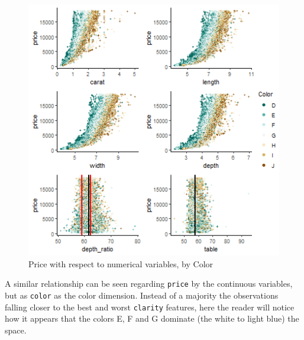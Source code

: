 \documentclass[
  paper=a4,
  ,captions=tableheading
]{scrartcl}
\begin{document}
\begin{figure}[H]

{\centering \includegraphics[width=\linewidth,]{Diamonds_PDF_files/figure-latex/Price by X and Color-1}

}

\caption{Price with respect to numerical variables, by Color}\label{fig:Price by X and Color}
\end{figure}

A similar relationship can be seen regarding \texttt{price} by the
continuous variables, but as \texttt{color} as the color dimension.
Instead of a majority the observations falling closer to the best and
worst \texttt{clarity} features, here the reader will notice how it
appears that the colors E, F and G dominate (the white to light blue)
the space.
\end{document}
